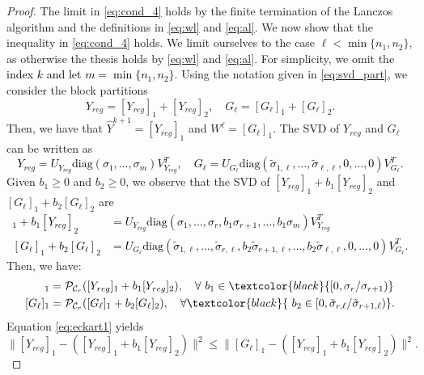 \documentclass[pdflatex,sn-mathphys-num]{sn-jnl}
\numberwithin{equation}{section}%
\newcommand{\setRank}{{\mathcal{C}_r}}
\newcommand{\proj}{\mathcal{P}}
\newcommand{\cZ}{G}
\def\diag{\text{diag}}
\newcommand{\Tsvd}[1]{[ #1 ]_1}
\newcommand{\tsvd}[1]{[ #1 ]_2}
\newcommand{\ste}[1]{\textcolor{black}{#1}}
\theoremstyle{thmstyleone}%
\theoremstyle{thmstyletwo}%
\theoremstyle{thmstylethree}%
\begin{document}
\begin{proof}
{The limit in \eqref{eq:cond_4} holds by the finite termination of the Lanczos algorithm and the definitions in \eqref{eq:wl} and \eqref{eq:al}. We now show that the inequality in \eqref{eq:cond_4} holds. We limit ourselves to the case $\ell < \min\{n_1,n_2\}$, as otherwise the thesis holds by \eqref{eq:wl} and \eqref{eq:al}}. For simplicity, we omit the \ste{index $k$ and let $m=\min\{n_1,n_2\}$}. Using the notation given in \eqref{eq:svd_part}, we consider the block partitions
\begin{equation}
    Y_{reg} = \Tsvd{Y_{reg}} + \tsvd{Y_{reg}}, \quad \cZ_\ell      = {\Tsvd{\cZ_\ell}} + \tsvd{\cZ_\ell}.\label{Z_part}
\end{equation}
Then, we have that $ \hat Y^{k+1}=\Tsvd{Y_{reg}}$ and $ W^\ell=\Tsvd{\cZ_\ell}$.
The SVD of $Y_{reg}$ and $\cZ_\ell$ can be written as
\ste{
\begin{equation*}
    Y_{reg} = U_{Y_{reg}} \diag(\sigma_1, \dots, \sigma_{m}) V_{Y_{reg}}^T, \quad \cZ_\ell     = U_{\cZ_\ell}       \diag(\tilde\sigma_{1,\ell}, \dots,\tilde\sigma_{\ell,\ell}, 0,\ldots,0)        V_{\cZ_\ell}^T.
\end{equation*}}
Given $b_1\ge 0$ and $b_2\ge 0$, we observe that the SVD  of $\Tsvd{Y_{reg}} + b_1 \tsvd{Y_{reg}}$ and $\Tsvd{\cZ_\ell} + b_2 \tsvd{\cZ_\ell}$ are \ste{
\begin{align*}
    \Tsvd{Y_{reg}} + b_1 \tsvd{Y_{reg}} &= U_{Y_{reg}} \diag(\sigma_1, \dots, \sigma_r,b_1 \sigma_{r+1}, \dots, b_1 \sigma_m) V_{Y_{reg}}^T \\
    \Tsvd{\cZ_\ell} + b_2 \tsvd{\cZ_\ell}           &= U_{\cZ_\ell}        \diag(\tilde\sigma_{1,\ell}, \dots, \tilde\sigma_{r,\ell}, b_2 \tilde\sigma_{r+1,\ell}, \dots, b_2 \tilde\sigma_{\ell,\ell},0,\dots,0)           V_{\cZ_\ell}^T.
\end{align*}}
Then, we have:
\begin{align}
    \Tsvd{Y_{reg}} &= \proj_\setRank (\Tsvd{Y_{reg}} + b_1 \tsvd{Y_{reg}}), \quad \forall \ b_1 \in \ste{[0, \sigma_r/\sigma_{r+1}) }\label{eq:eckart1}\\
    \Tsvd{\cZ_\ell}      &= \proj_\setRank (\Tsvd{\cZ_\ell} + b_2 \tsvd{\cZ_\ell}),           \quad \forall\ste{ \ b_2 \in [0, \tilde\sigma_{r,\ell}/\tilde\sigma_{r+1,\ell})}.\label{eq:eckart2}
\end{align}
Equation \eqref{eq:eckart1} yields
$$
    \|\Tsvd{Y_{reg}}  - (\Tsvd{Y_{reg}}  + b_1 \tsvd{Y_{reg}})\|^2  \le \|\Tsvd{\cZ_\ell} -(\Tsvd{Y_{reg}}  + b_1 \tsvd{Y_{reg}}) \|^2.
$$
\end{proof}
\end{document}
